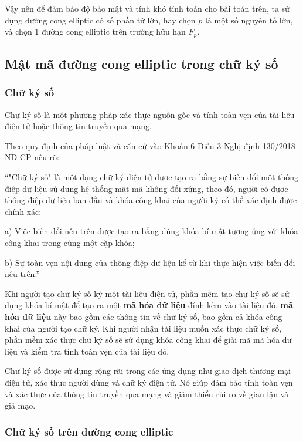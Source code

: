 Vậy nên để đảm bảo độ bảo mật và tính khó tính toán cho bài toán trên,
ta sử dụng đường cong elliptic có số phần tử lớn, hay chọn $p$ là một
số nguyên tố lớn, và chọn 1 đường cong elliptic trên trường hữu hạn $F_p$. \cite{Elliptic_Curve}

\subsection{Mật mã đường cong elliptic trong chữ ký số}
\subsubsection{Chữ ký số} 

Chữ ký số là một phương pháp xác thực nguồn gốc và tính toàn vẹn của tài liệu điện tử hoặc thông tin truyền qua mạng. 

Theo quy định của pháp luật và căn cứ vào Khoản 6 Điều 3 Nghị định 130/2018 NĐ-CP nêu rõ: 

“"Chữ ký số" là một dạng chữ ký điện tử được tạo ra bằng sự biến đổi một thông điệp dữ liệu sử dụng hệ thống mật mã không đối xứng, theo đó, người có được thông điệp dữ liệu ban đầu và khóa công khai của người ký có thể xác định được chính xác:

a) Việc biến đổi nêu trên được tạo ra bằng đúng khóa bí mật tương ứng với khóa công khai trong cùng một cặp khóa;

b) Sự toàn vẹn nội dung của thông điệp dữ liệu kể từ khi thực hiện việc biến đổi nêu trên.”

Khi người tạo chữ ký số ký một tài liệu điện tử, phần mềm tạo chữ ký số sẽ sử dụng khóa bí mật để tạo ra một \textbf{mã hóa dữ liệu} đính kèm vào tài liệu đó. \textbf{mã hóa dữ liệu}  này bao gồm các thông tin về chữ ký số, bao gồm cả khóa công khai của người tạo chữ ký. Khi người nhận tài liệu muốn xác thực chữ ký số, phần mềm xác thực chữ ký số sẽ sử dụng khóa công khai để giải mã mã hóa dữ liệu và kiểm tra tính toàn vẹn của tài liệu đó.

Chữ ký số được sử dụng rộng rãi trong các ứng dụng như giao dịch thương mại điện tử, xác thực người dùng và chữ ký điện tử. Nó giúp đảm bảo tính toàn vẹn và xác thực của thông tin truyền qua mạng và giảm thiểu rủi ro về gian lận và giả mạo.

\subsubsection{Chữ ký số trên đường cong elliptic}

